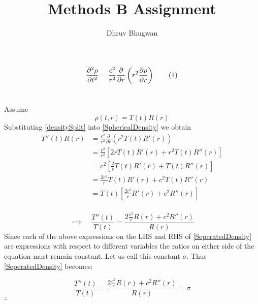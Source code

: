 \documentclass[10pt]{article}
\numberwithin{equation}{section}
\begin{document}
	\title{Methods B Assignment}
	\author{Dhruv Bhugwan}
	\maketitle
	\begin{equation}
		\pdv[2]{\rho}{t} = \frac{c^2}{r^2} \frac{\partial}{\partial r} \left(r^2 \pdv{\rho}{r}\right)\tag{1}\label{SphericalDensity}
	\end{equation}
	\section{}
		Assume
		\begin{equation}
			\rho(t,r) = T(t) R(r)\label{densitySplit}
		\end{equation}
	 	Substituting \ref{densitySplit} into \ref{SphericalDensity} we obtain
		\begin{equation*}
			\begin{split}
				T''(t) R(r) &= \frac{c^2}{r^2} \frac{\partial}{\partial r} (r^2 T(t)R'(r))\\
				&=\frac{c^2}{r^2} \left[2r T(t) R'(r) + r^2 T(t) R''(r) \right]\\
				&= c^2 \left[\frac{2}{r} T(t) R'(r) + T(t) R''(r) \right]\\
				&= \frac{2 c^2}{r} T(t) R'(r) + c^2 T(t) R''(r)\\
				&= T(t) \left[\frac{2 c^2}{r} R'(r) + c^2 R''(r)\right]\\
			\end{split}
		\end{equation*}
		
		\begin{equation}\label{SeperatedDensity}
			\implies\quad \frac{T''(t)}{T(t)} = \frac{2 \frac{c^2}{r} R(r) + c^2 R''(r)}{R(r)}
		\end{equation}
		Since each of the above expressions on the LHS and RHS of \ref{SeperatedDensity} are 						expressions with respect to different variables the ratios on either side of the equation 				must remain constant. Let us call this constant \(\sigma\). Thus \ref{SeperatedDensity} 					becomes:
		
		\begin{equation}\label{SeperatedDensityConstant}
			\frac{T''(t)}{T(t)} = \frac{2 \frac{c^2}{r} R(r) + c^2 R''(r)}{R(r)} = \sigma
		\end{equation}
		\(\therefore\)
\end{document}
